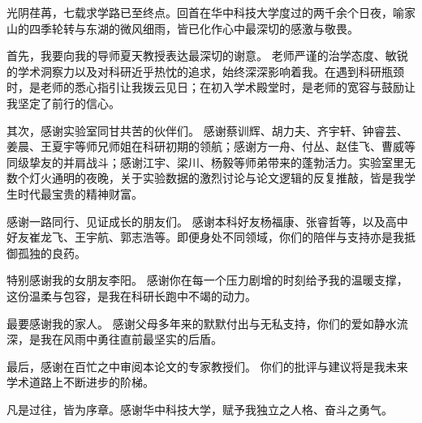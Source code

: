 

\begin{ack}

光阴荏苒，七载求学路已至终点。回首在华中科技大学度过的两千余个日夜，喻家山的四季轮转与东湖的微风细雨，皆已化作心中最深切的感激与敬畏。

首先，我要向我的导师夏天教授表达最深切的谢意。 老师严谨的治学态度、敏锐的学术洞察力以及对科研近乎热忱的追求，始终深深影响着我。在遇到科研瓶颈时，是老师的悉心指引让我拨云见日；在初入学术殿堂时，是老师的宽容与鼓励让我坚定了前行的信心。

其次，感谢实验室同甘共苦的伙伴们。 感谢蔡训辉、胡力夫、齐宇轩、钟睿芸、姜晨、王夏宇等师兄师姐在科研初期的领航；感谢方一舟、付丛、赵佳飞、曹威等同级挚友的并肩战斗；感谢江宇、梁川、杨毅等师弟带来的蓬勃活力。实验室里无数个灯火通明的夜晚，关于实验数据的激烈讨论与论文逻辑的反复推敲，皆是我学生时代最宝贵的精神财富。

感谢一路同行、见证成长的朋友们。 感谢本科好友杨福康、张睿哲等，以及高中好友崔龙飞、王宇航、郭志浩等。即便身处不同领域，你们的陪伴与支持亦是我抵御孤独的良药。

特别感谢我的女朋友李阳。 感谢你在每一个压力剧增的时刻给予我的温暖支撑，这份温柔与包容，是我在科研长跑中不竭的动力。

最要感谢我的家人。 感谢父母多年来的默默付出与无私支持，你们的爱如静水流深，是我在风雨中勇往直前最坚实的后盾。

最后，感谢在百忙之中审阅本论文的专家教授们。 你们的批评与建议将是我未来学术道路上不断进步的阶梯。

凡是过往，皆为序章。感谢华中科技大学，赋予我独立之人格、奋斗之勇气。

\end{ack}
